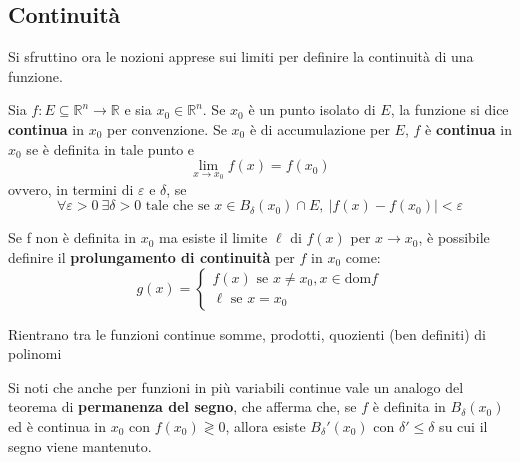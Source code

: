 \subsection{Continuità}
Si sfruttino ora le nozioni apprese sui limiti per definire la continuità di una funzione.
\begin{definition} \label{Def: Continuità}
    Sia $f: E \subseteq \mathbb{R}^n \to \mathbb{R}$ e sia $x_0 \in \mathbb{R}^n$. Se $x_0$ è un punto isolato di $E$, la funzione si dice \textbf{continua} in $x_0$ per convenzione. Se $x_0$ è di accumulazione per $E$, $f$ è \textbf{continua} in $x_0$ se è definita in tale punto e
    \begin{equation} \label{Eq: Continuità}
        \lim_{x \to x_0} f(x)= f(x_0)
    \end{equation}
    ovvero, in termini di $\varepsilon$ e $\delta$, se
    \begin{equation}
        \forall \varepsilon > 0 \  \exists \delta>0 \text{ tale che se } x \in B_\delta(x_0) \cap E, \ |f(x)-f(x_0)|< \varepsilon
    \end{equation}
    \end{definition}
    \begin{oss}
        Se f non è definita in $x_0$ ma esiste il limite $\ell$ di $f(x)$ per $x \to x_0$, è possibile definire il \textbf{prolungamento di continuità} per $f$ in $x_0$ come:
        \begin{equation}
            g(x) = \begin{cases}
                f(x) \text{ se } x \neq x_0, x \in \text{dom}f\\
                \ell \text { se } x=x_0
            \end{cases}
        \end{equation}
    \end{oss}
    \begin{oss}
        Rientrano tra le funzioni continue somme, prodotti, quozienti (ben definiti) di polinomi
    \end{oss}
\vspace*{\baselineskip}
Si noti che anche per funzioni in più variabili continue vale un analogo del teorema di \textbf{permanenza del segno}, che afferma che, se $f$ è definita in $B_\delta(x_0)$ ed è continua in $x_0$ con $f(x_0) \gtrless 0$, allora esiste $B_\delta'(x_0)$ con $\delta' \leq \delta$ su cui il segno viene mantenuto.
